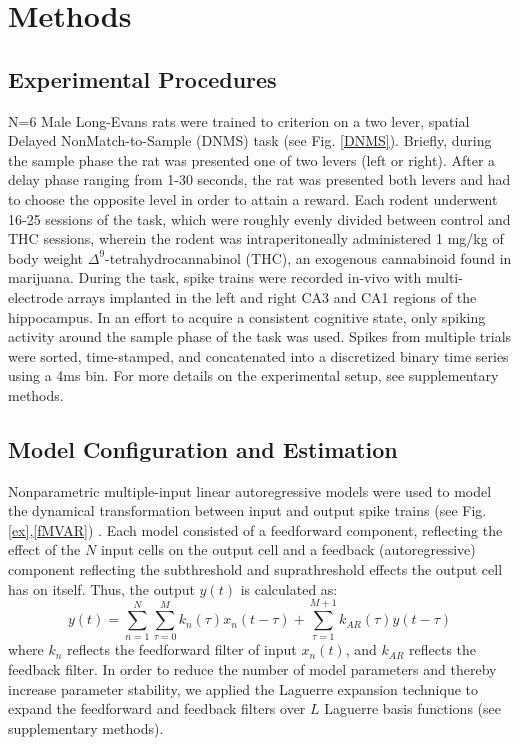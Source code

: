 \documentclass[11pt,a4paper,final]{article}
\begin{document}
\section{Methods \label{meth}}

    \subsection{Experimental Procedures \label{expmeth}}

N=6 Male Long-Evans rats were trained to criterion on a two lever, spatial Delayed NonMatch-to-Sample (DNMS) task (see Fig. \ref{DNMS}).
Briefly, during the sample phase the rat was presented one of two levers (left or right).
After a delay phase ranging from 1-30 seconds, the rat was presented both levers and had to choose the opposite level in order to attain a reward.
Each rodent underwent 16-25 sessions of the task, which were roughly evenly divided between control and THC sessions, wherein the rodent was intraperitoneally administered 1 mg/kg of body weight $\Delta^9$-tetrahydrocannabinol (THC), an exogenous cannabinoid found in marijuana.
During the task, spike trains were recorded in-vivo with multi-electrode arrays implanted in the left and right CA3 and CA1 regions of the hippocampus.
In an effort to acquire a consistent cognitive state, only spiking activity around the sample phase of the task was used.
Spikes from multiple trials were sorted, time-stamped, and concatenated into a discretized binary time series using a 4ms bin.
For more details on the experimental setup, see supplementary methods.

    \subsection{Model Configuration and Estimation}
Nonparametric multiple-input linear autoregressive models were used to model the dynamical transformation between input and output spike trains (see Fig. \ref{ex},\ref{fMVAR}) \citep{sandler14,sandler15}.
Each model consisted of a feedforward component, reflecting the effect of the $N$ input cells on the output cell and a feedback (autoregressive) component reflecting the subthreshold and suprathreshold effects the output cell has on itself. Thus, the output $y(t)$ is calculated as:
\begin{equation}
    y(t)=\sum_{n=1}^{N}\sum_{\tau=0}^{M}k_{n}(\tau)x_{n}(t-\tau)+\sum_{\tau=1}^{M+1}k_{AR}(\tau)y(t-\tau)
\label{eq:MVAR}
\end{equation}
where $k_{n}$ reflects the feedforward filter of input $x_n(t)$, and $k_{AR}$ reflects the feedback filter.
In order to reduce the number of model parameters and thereby increase parameter stability, we applied the Laguerre expansion technique to expand the feedforward and feedback filters over $L$ Laguerre basis functions (see supplementary methods).
\end{document}
